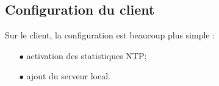 \subsection{Configuration du client}
\label{subsec:configuration-client}

Sur le client, la configuration est beaucoup plus simple :
\begin{itemize}

    \item[$\bullet$] activation des statistiques NTP;
    \item[$\bullet$] ajout du serveur local.

\end{itemize}
